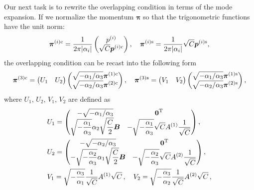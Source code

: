 \documentclass[12pt]{article}
\begin{document}
Our next task is to rewrite the overlapping condition in terms of the
mode expansion.
If we normalize the momentum $\boldsymbol{\pi}$ so that the
trigonometric functions have the unit norm:
\begin{align}
\boldsymbol{\pi}^{(i){\rm c}}=\frac{1}{2\pi|\alpha_i|}
\begin{pmatrix}p^{(i)}\\
\sqrt{C}\boldsymbol{p}^{(i){\rm c}}\end{pmatrix},
\quad\boldsymbol{\pi}^{(i){\rm s}}=\frac{1}{2\pi|\alpha_i|}
\sqrt{C}\boldsymbol{p}^{(i){\rm s}},
\end{align}
the overlapping condition can be recast into the following form
\begin{align}
\boldsymbol{\pi}^{(3){\rm c}}=
\begin{pmatrix}U_1&U_2\end{pmatrix}
\begin{pmatrix}\sqrt{-\alpha_1/\alpha_3}
\boldsymbol{\pi}^{(1){\rm c}}\\
\sqrt{-\alpha_2/\alpha_3}
\boldsymbol{\pi}^{(2){\rm c}}\end{pmatrix},\quad
\boldsymbol{\pi}^{(3){\rm s}}=
\begin{pmatrix}V_1&V_2\end{pmatrix}
\begin{pmatrix}\sqrt{-\alpha_1/\alpha_3}
\boldsymbol{\pi}^{(1){\rm s}}\\
\sqrt{-\alpha_2/\alpha_3}
\boldsymbol{\pi}^{(2){\rm s}}\end{pmatrix},
\end{align}
where $U_1$, $U_2$, $V_1$, $V_2$ are defined as
\begin{align}
&U_1=\begin{pmatrix}
-\sqrt{-\alpha_1/\alpha_3}&\boldsymbol{0}^{{\rm T}}\\
\displaystyle{\sqrt{-\frac{\alpha_1}{\alpha_3}}}\alpha_2
\displaystyle{\sqrt{\frac{C}{2}}}\boldsymbol{B}&
-\displaystyle{\sqrt{-\frac{\alpha_1}{\alpha_3}}}\sqrt{C}A^{(1)}
\displaystyle{\frac{1}{\sqrt{C}}}
\end{pmatrix},\nonumber\\
&U_2=\begin{pmatrix}
-\sqrt{-\alpha_2/\alpha_3}&\boldsymbol{0}^{{\rm T}}\\
-\displaystyle{\sqrt{-\frac{\alpha_2}{\alpha_3}}}\alpha_1
\sqrt{\frac{C}{2}}\boldsymbol{B}&
-\displaystyle{\sqrt{-\frac{\alpha_2}{\alpha_3}}}
\sqrt{C}A^{(2)}\frac{1}{\sqrt{C}}
\end{pmatrix},\\
&V_1=\sqrt{-\frac{\alpha_3}{\alpha_1}}
\frac{1}{\sqrt{C}}A^{(1)}\sqrt{C}\,,\quad
V_2=\sqrt{-\frac{\alpha_3}{\alpha_2}}
\frac{1}{\sqrt{C}}A^{(2)}\sqrt{C}\,,\nonumber
\end{align}
\end{document}
